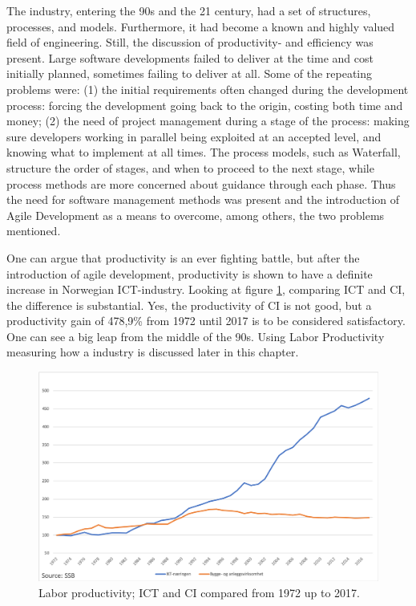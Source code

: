 The industry, entering the 90s and the 21 century, had a set of structures, processes, and models. Furthermore, it had become a known and highly valued field of engineering. Still, the discussion of productivity- and efficiency was present. Large software developments failed to deliver at the time and cost initially planned, sometimes failing to deliver at all.  Some of the repeating problems were: (1) the initial requirements often changed during the development process: forcing the development going back to the origin, costing both time and money; (2) the need of project management during a stage of the process: making sure developers working in parallel being exploited at an accepted level, and knowing what to implement at all times. The process models, such as Waterfall, structure the order of stages, and when to proceed to the next stage, while process methods are more concerned about guidance through each phase. Thus the need for software management methods was present and the introduction of Agile Development as a means to overcome, among others, the two problems mentioned. 

One can argue that productivity is an ever fighting battle, but after the introduction of agile development, productivity is shown to have a definite increase in Norwegian ICT-industry. Looking at figure \ref{fig:ICT_BA_1972}, comparing ICT and CI, the difference is substantial. Yes, the productivity of CI is not good, but a productivity gain of 478,9\% from 1972 until 2017 is to be considered satisfactory. One can see a big leap from the middle of the 90s. Using Labor Productivity measuring how a industry is discussed later in this chapter.

\begin{figure}
    \centering
    \includegraphics[width=\textwidth]{fig/ICT_BA_1972.png}
    \caption{Labor productivity; ICT and CI compared from 1972 up to 2017.}
    \label{fig:ICT_BA_1972}
\end{figure}

